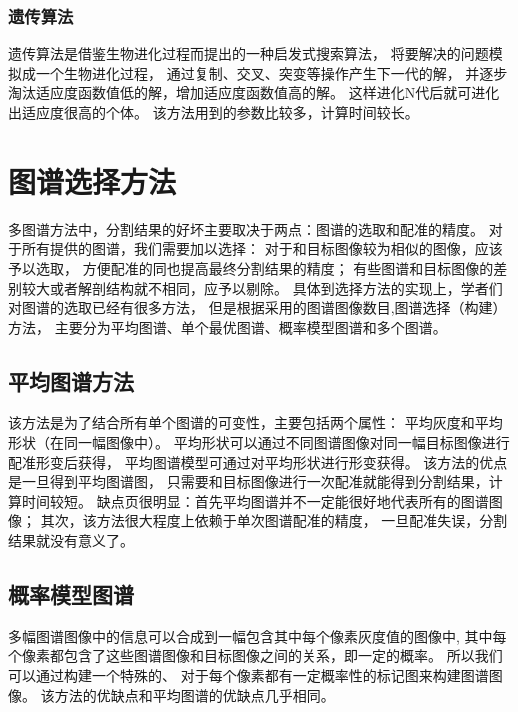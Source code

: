 \subsubsection{遗传算法}
遗传算法是借鉴生物进化过程而提出的一种启发式搜索算法，
将要解决的问题模拟成一个生物进化过程，
通过复制、交叉、突变等操作产生下一代的解，
并逐步淘汰适应度函数值低的解，增加适应度函数值高的解。
这样进化N代后就可进化出适应度很高的个体。
该方法用到的参数比较多，计算时间较长。





\section{图谱选择方法}%
多图谱方法中，分割结果的好坏主要取决于两点：图谱的选取和配准的精度。
对于所有提供的图谱，我们需要加以选择：
对于和目标图像较为相似的图像，应该予以选取，
方便配准的同也提高最终分割结果的精度；
有些图谱和目标图像的差别较大或者解剖结构就不相同，应予以剔除。
具体到选择方法的实现上，学者们对图谱的选取已经有很多方法，
但是根据采用的图谱图像数目,图谱选择（构建）方法，
主要分为平均图谱、单个最优图谱、概率模型图谱和多个图谱。

\subsection{平均图谱方法}
该方法是为了结合所有单个图谱的可变性，主要包括两个属性：
平均灰度和平均形状（在同一幅图像中）。
平均形状可以通过不同图谱图像对同一幅目标图像进行配准形变后获得，
平均图谱模型可通过对平均形状进行形变获得。
该方法的优点是一旦得到平均图谱图，
只需要和目标图像进行一次配准就能得到分割结果，计算时间较短。
缺点页很明显：首先平均图谱并不一定能很好地代表所有的图谱图像；
其次，该方法很大程度上依赖于单次图谱配准的精度，
一旦配准失误，分割结果就没有意义了。

\subsection{概率模型图谱}
多幅图谱图像中的信息可以合成到一幅包含其中每个像素灰度值的图像中,
其中每个像素都包含了这些图谱图像和目标图像之间的关系，即一定的概率。
所以我们可以通过构建一个特殊的、
对于每个像素都有一定概率性的标记图来构建图谱图像。
该方法的优缺点和平均图谱的优缺点几乎相同。

